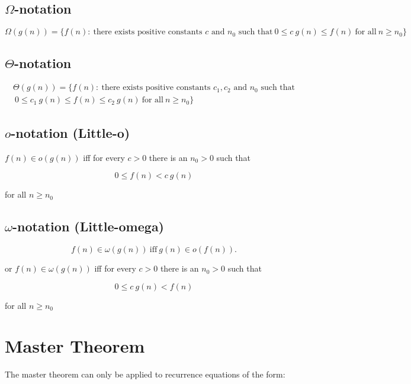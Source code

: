 \documentclass{article}
\begin{document}
\subsection{$\Omega$-notation}
\begin{equation*}
\Omega(g(n)) = \{ f(n) : \ \text{there exists positive constants $c$ and $n_0$ such that} \ 0 \leq c \ g(n) \leq f(n) \ \text{for all} \ n \geq n_0 \}
\end{equation*}

\subsection{$\Theta$-notation}
\begin{align*}
\Theta(g(n)) = \{ f(n) : \ \text{there exists positive constants $c_1, c_2$ and $n_0$ such that} \\ \ 0 \leq c_1 \ g(n) \leq f(n) \leq c_2\ g(n) \ \text{for all} \ n \geq n_0 \}
\end{align*}

\subsection{$o$-notation (Little-o)}
$f(n) \in o(g(n)) $ iff for every $c > 0$ there is an $n_0 > 0$ such that

\begin{equation*}
0 \leq f(n) < c \ g(n)
\end{equation*}

for all $n \geq n_0$

\subsection{$\omega$-notation (Little-omega)}
\begin{equation*}
f(n) \in \omega(g(n)) \ \text{iff} \ g(n) \in o(f(n)).
\end{equation*}

or $f(n) \in \omega(g(n))$ iff for every $c > 0$ there is an $n_0 > 0$ such that

\begin{equation*}
0 \leq c \ g(n) < f(n)
\end{equation*}

for all $n \geq n_0$

\section{Master Theorem}
The master theorem can only be applied to recurrence equations of the form:
\end{document}
